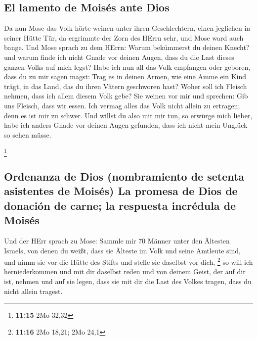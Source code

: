 \hypertarget{el-lamento-de-moisuxe9s-ante-dios}{%
\subsection{El lamento de Moisés ante
Dios}\label{el-lamento-de-moisuxe9s-ante-dios}}

 Da nun Mose das Volk hörte weinen unter ihren
Geschlechtern, einen jeglichen in seiner Hütte Tür, da ergrimmte der
Zorn des HErrn sehr, und Mose ward auch bange.  Und Mose
sprach zu dem HErrn: Warum bekümmerst du deinen Knecht? und warum finde
ich nicht Gnade vor deinen Augen, dass du die Last dieses ganzen Volks
auf mich legst?  Habe ich nun all das Volk empfangen oder
geboren, dass du zu mir sagen magst: Trag es in deinen Armen, wie eine
Amme ein Kind trägt, in das Land, das du ihren Vätern geschworen hast?
 Woher soll ich Fleisch nehmen, dass ich allem diesem
Volk gebe? Sie weinen vor mir und sprechen: Gib uns Fleisch, dass wir
essen.  Ich vermag alles das Volk nicht allein zu
ertragen; denn es ist mir zu schwer.  Und willst du also
mit mir tun, so erwürge mich lieber, habe ich anders Gnade vor deinen
Augen gefunden, dass ich nicht mein Unglück so sehen müsse.

\footnote{\textbf{11:15} 2Mo 32,32}

\hypertarget{ordenanza-de-dios-nombramiento-de-setenta-asistentes-de-moisuxe9s-la-promesa-de-dios-de-donaciuxf3n-de-carne-la-respuesta-incruxe9dula-de-moisuxe9s}{%
\subsection{Ordenanza de Dios (nombramiento de setenta asistentes de
Moisés) La promesa de Dios de donación de carne; la respuesta incrédula
de
Moisés}\label{ordenanza-de-dios-nombramiento-de-setenta-asistentes-de-moisuxe9s-la-promesa-de-dios-de-donaciuxf3n-de-carne-la-respuesta-incruxe9dula-de-moisuxe9s}}

 Und der HErr sprach zu Mose: Sammle mir 70 Männer unter
den Ältesten Israels, von denen du weißt, dass sie Älteste im Volk und
seine Amtleute sind, und nimm sie vor die Hütte des Stifts und stelle
sie daselbst vor dich, \footnote{\textbf{11:16} 2Mo 18,21; 2Mo 24,1}
 so will ich herniederkommen und mit dir daselbst reden
und von deinem Geist, der auf dir ist, nehmen und auf sie legen, dass
sie mit dir die Last des Volkes tragen, dass du nicht allein tragest.


